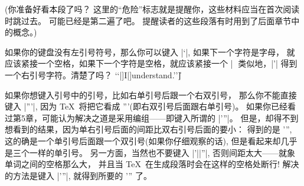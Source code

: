 \danger (你准备好看本段了吗？%
这里的``危险''标志就是提醒你，这些材料应当在首次阅读时跳过\hbox{去。}%
可能已经是第二遍了吧。%
提醒读者的这些段落有时用到了后面章节中的概念。)

\danger 如果你的键盘没有左引号符号，那么你可以键入 |\lq|, 如果下一个字符是字母，%
就应该紧接一个空格，如果下一个字符是空格，就应该紧接一个 |\|。%
类似地，|\rq| 得到一个右引号字符。清楚了吗？
\begintt
\lq\lq|]I|]understand.\rq\rq\|]
\endtt

\danger 如果你想键入引号中的引号，比如右单引号后跟一个右双引号，
那么你不能直接键入 |'''|, 因为 \TeX\ 将把它看成 '''(即右双引号后面跟右单引号)。%
如果你已经看过第5章，可能认为解决之道是采用编组——即键入所谓的 |{'}''|。%
但是，却得不到想看到的结果，因为单右引号后面的间距比双右引号后面的要小：
得到的是 {'}'', 这的确是一个单引号后面跟一个双引号(如果你仔细观察的话),
但是看起来却几乎是三个一样的单引号。%
另一方面，当然也不要键入 |'|\]|''|, 否则间距太大——就象单词之间的空格那么大，
并且当 \TeX\ 在生成段落时会在这样的空格处断行!
解决的方法是键入 |'\thinspace''|, 就得到所要的 '\thinspace'' 了。

